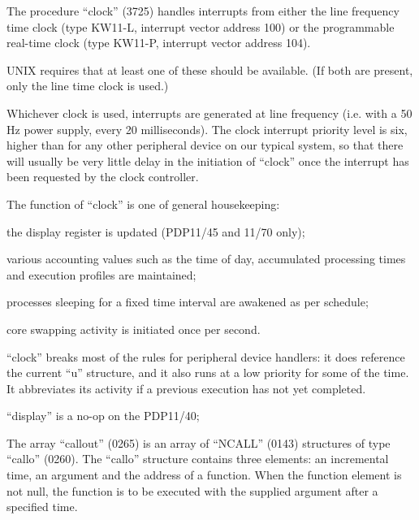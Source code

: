 %
%

The procedure ``clock'' (3725) handles
interrupts from either the line frequency time clock
(type \mbox{KW11-L}, interrupt vector address 100) or the
programmable real-time clock (type KW11-P,
interrupt vector address 104).

UNIX requires that at least one of
these should be available. (If both are
present, only the line time clock is
used.)

Whichever clock is used, interrupts are
generated at line frequency (i.e. with
a 50 Hz power supply, every 20 milliseconds).
The clock interrupt priority level is six, higher than for any
other peripheral device on our typical
system, so that there will usually be
very little delay in the initiation of
``clock'' once the interrupt has been
requested by the clock controller.



The function of ``clock'' is one of general housekeeping:

\bi
\item the display register is updated
(PDP11/45 and 11/70 only);

\item various accounting values such as
the time of day, accumulated processing times
and execution profiles are maintained;

\item processes sleeping for a fixed
time interval are awakened as per
schedule;

\item core swapping activity is initiated once per second.
\ei

``clock'' breaks most of the rules for
peripheral device handlers: it does
reference the current ``u'' structure,
and it also runs at a low priority for
some of the time. It abbreviates its
activity if a previous execution has
not yet completed.

\bd
\item[3740:] ``display'' is a no-op on the
 PDP11/40;

\item[3743:] The array ``callout'' (0265) is an
 array of ``NCALL'' (0143) structures
of type ``callo'' (0260).
The ``callo'' structure contains
three elements: an incremental
time, an argument and the address
of a function. When the function
element is not null, the function
is to be executed with the supplied
argument after a specified time.


